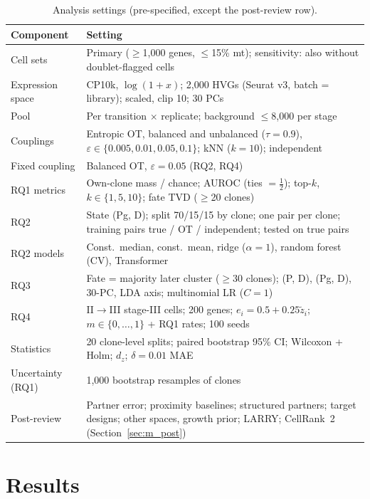 \documentclass[10pt,journal,compsoc]{IEEEtran}
\begin{document}
\begin{table}[!t]
\centering
\caption{Analysis settings (pre-specified, except the post-review row).}
\label{tab:methods}
\footnotesize
\renewcommand{\arraystretch}{1.15}
\begin{tabular}{@{}p{}p{}@{}}
\toprule
Component & Setting \\
\midrule
Cell sets & Primary ($\geq$1{,}000 genes, $\leq$15\% mt); sensitivity: also without doublet-flagged cells \\
Expression space & CP10k, $\log(1{+}x)$; 2{,}000 HVGs (Seurat v3, batch = library); scaled, clip 10; 30 PCs \\
Pool & Per transition $\times$ replicate; background $\leq$8{,}000 per stage \\
Couplings & Entropic OT, balanced and unbalanced ($\tau=0.9$), $\varepsilon\in\{0.005,0.01,0.05,0.1\}$; kNN ($k=10$); independent \\
Fixed coupling & Balanced OT, $\varepsilon=0.05$ (RQ2, RQ4) \\
RQ1 metrics & Own-clone mass / chance; AUROC (ties $=\frac12$); top-$k$, $k\in\{1,5,10\}$; fate TVD ($\geq$20 clones) \\
RQ2 & State (Pg, D); split 70/15/15 by clone; one pair per clone; training pairs true / OT / independent; tested on true pairs \\
RQ2 models & Const.\ median, const.\ mean, ridge ($\alpha=1$), random forest (CV), Transformer \\
RQ3 & Fate = majority later cluster ($\geq$30 clones); (P, D), (Pg, D), 30-PC, LDA axis; multinomial LR ($C=1$) \\
RQ4 & II$\to$III stage-III cells; 200 genes; $e_i=0.5+0.25\tilde{z}_i$; $m\in\{0,\dots,1\}$ + RQ1 rates; 100 seeds \\
Statistics & 20 clone-level splits; paired bootstrap 95\% CI; Wilcoxon + Holm; $d_z$; $\delta=0.01$ MAE \\
Uncertainty (RQ1) & 1{,}000 bootstrap resamples of clones \\
Post-review & Partner error; proximity baselines; structured partners; target designs; other spaces, growth prior; LARRY; CellRank~2 (Section~\ref{sec:m_post}) \\
\bottomrule
\end{tabular}
\end{table}

\section{Results}\label{sec:results}
\end{document}
